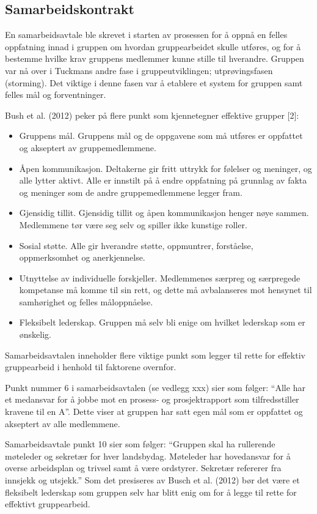 \subsection{Samarbeidskontrakt}

En samarbeidsavtale ble skrevet i starten av prosessen for å oppnå en felles oppfatning innad i gruppen om hvordan gruppearbeidet skulle utføres, og for å bestemme hvilke krav gruppens medlemmer kunne stille til hverandre. Gruppen var nå over i Tuckmans andre fase i gruppeutviklingen; utprøvingsfasen (storming). Det viktige i denne fasen var å etablere et system for gruppen samt felles mål og forventninger. 

Bush et al. (2012) peker på flere punkt som kjennetegner effektive grupper [2]:

\begin{itemize}
	\item Gruppens mål. Gruppens mål og de oppgavene som må utføres er oppfattet og akseptert av gruppemedlemmene.
	\item Åpen kommunikasjon. Deltakerne gir fritt uttrykk for følelser og meninger, og alle lytter aktivt. Alle er innstilt på å endre oppfatning på grunnlag av fakta og meninger som de andre gruppemedlemmene legger fram.
	\item Gjensidig tillit. Gjensidig tillit og åpen kommunikasjon henger nøye sammen. Medlemmene tør være seg selv og spiller ikke kunstige roller.
	\item Sosial støtte. Alle gir hverandre støtte, oppmuntrer, forståelse, oppmerksomhet og anerkjennelse.
	\item Utnyttelse av individuelle forskjeller. Medlemmenes særpreg og særpregede kompetanse må komme til sin rett, og dette må avbalanseres mot hensynet til samhørighet og felles måloppnåelse.
	\item Fleksibelt lederskap. Gruppen må selv bli enige om hvilket lederskap som er ønskelig.
\end{itemize}

Samarbeidsavtalen inneholder flere viktige punkt som legger til rette for effektiv gruppearbeid i henhold til faktorene overnfor. 

Punkt nummer 6 i samarbeidsavtalen (se vedlegg xxx) sier som følger: “Alle har et medansvar for å jobbe mot en prosess- og prosjektrapport som tilfredsstiller kravene til en A”. Dette viser at gruppen har satt egen mål som er oppfattet og akseptert av alle medlemmene.

Samarbeidsavtale punkt 10 sier som følger: “Gruppen skal ha rullerende møteleder og sekretær for hver landsbydag. Møteleder har hovedansvar for å overse arbeidsplan og trivsel samt å være ordstyrer. Sekretær refererer fra innsjekk og utsjekk.” Som det presiseres av Busch et al. (2012) bør det være et fleksibelt lederskap som gruppen selv har blitt enig om for å legge til rette for effektivt gruppearbeid.

